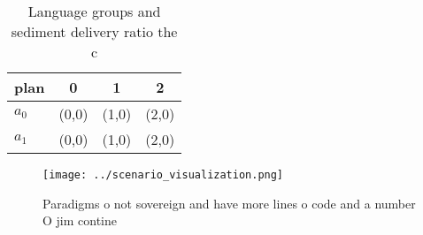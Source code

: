 \documentclass[a4paper]{article}
\begin{document}
\begin{table}
\begin{adjustbox}{width=0.6\columnwidth}
\begin{tabular}{|l|l|l|l|}
\hline
\textbf{plan} & \multicolumn{1}{c|}{\textbf{0}} & \multicolumn{1}{c|}{\textbf{1}} & \multicolumn{1}{c|}{\textbf{2}} \\ \hline
\textbf{$a_0$}  & (0,0) & (1,0) & (2,0) \\ \hline
\textbf{$a_1$}  & (0,0) & (1,0) & (2,0) \\ \hline
\end{tabular}
\end{adjustbox}
\caption{Language groups and sediment delivery ratio the c
}
\end{table}

\begin{figure}
\centering
\texttt{[image: ../scenario\_visualization.png]}
\caption{Paradigms o not sovereign and have more lines o code and a number O jim contine
}
\end{figure}
 
\end{document}
